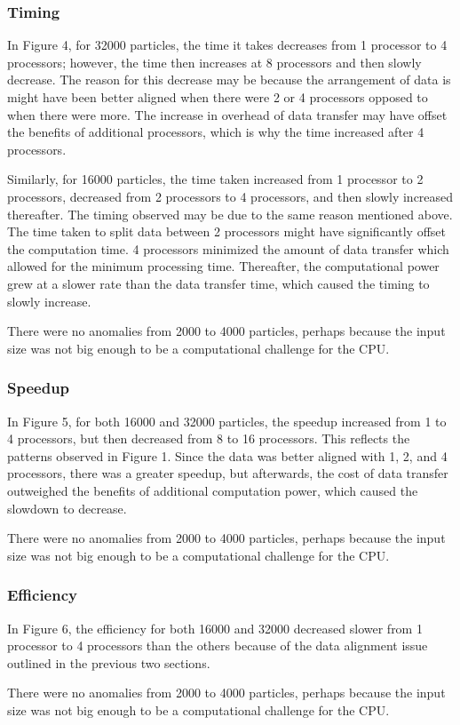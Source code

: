 \documentclass{article}
\begin{document}
\subsubsection{Timing}
In Figure 4, for 32000 particles, the time it takes decreases from 1 processor to 4 processors; however, the time then increases at 8 processors and then slowly decrease. The reason for this decrease may be because the arrangement of data is might have been better aligned when there were 2 or 4 processors opposed to when there were more. The increase in overhead of data transfer may have offset the benefits of additional processors, which is why the time increased after 4 processors.

Similarly, for 16000 particles, the time taken increased from 1 processor to 2 processors, decreased from 2 processors to 4 processors, and then slowly increased thereafter. The timing observed may be due to the same reason mentioned above. The time taken to split data between 2 processors might have significantly offset the computation time. 4 processors minimized the amount of data transfer which allowed for the minimum processing time. Thereafter, the computational power grew at a slower rate than the data transfer time, which caused the timing to slowly increase.

There were no anomalies from 2000 to 4000 particles, perhaps because the input size was not big enough to be a computational challenge for the CPU.
\subsubsection{Speedup}
In Figure 5, for both 16000 and 32000 particles, the speedup increased from 1 to 4 processors, but then decreased from 8 to 16 processors. This reflects the patterns observed in Figure 1. Since the data was better aligned with 1, 2, and 4 processors, there was a greater speedup, but afterwards, the cost of data transfer outweighed the benefits of additional computation power, which caused the slowdown to decrease.

There were no anomalies from 2000 to 4000 particles, perhaps because the input size was not big enough to be a computational challenge for the CPU.

\subsubsection{Efficiency}
In Figure 6, the efficiency for both 16000 and 32000 decreased slower from 1 processor to 4 processors than the others because of the data alignment issue outlined in the previous two sections. 

There were no anomalies from 2000 to 4000 particles, perhaps because the input size was not big enough to be a computational challenge for the CPU.
\end{document}
